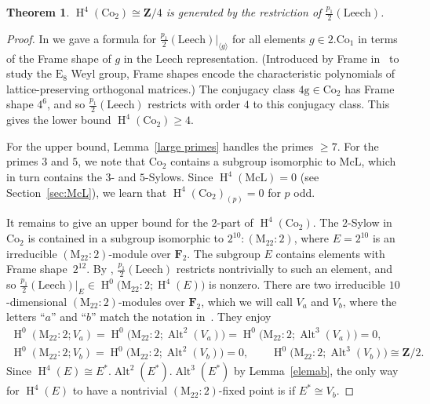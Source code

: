 \documentclass[pdftex]{sigma}
\numberwithin{equation}{section}
\newtheorem{Theorem}{Theorem}[section]
\newcommand\bF{\mathbf F}
\newcommand\bZ{\mathbf Z}
\newcommand\rg{\mathrm g}
\newcommand\rE{\mathrm E}
\newcommand\rM{\mathrm M}
\DeclareMathOperator\homology{H}
\renewcommand\H{\homology}
\newcommand\<\langle
\renewcommand\>\rangle
\newcommand\Co{\mathrm{Co}}
\newcommand\Leech{\mathrm{Leech}}
\DeclareMathOperator\Alt{Alt}
\begin{document}
\begin{Theorem}\label{thm.co2} $\H^4(\Co_2) \cong \bZ/4$ is generated by the restriction of $\frac{p_1}2(\Leech)$.
\end{Theorem}

\begin{proof} In \cite[Theorem 7.1]{jft} we gave a formula for $\frac{p_1}2(\Leech)|_{\langle g\rangle}$ for all elements $g \in 2.\Co_1$ in terms of the Frame shape of $g$ in the $\Leech$ representation. (Introduced by Frame in~\cite{MR0269751} to study the $\rE_8$ Weyl group, Frame shapes encode the characteristic polynomials of lattice-preserving orthogonal matrices.)
 The conjugacy class $4\rg \in \Co_2$ has Frame shape $4^6$, and so $\frac{p_1}2(\Leech)$ restricts with order $4$ to this conjugacy class. This gives the lower bound $\H^4(\Co_2) \geq 4$.

For the upper bound, Lemma~\ref{large primes} handles the primes $\geq 7$. For the primes $3$ and $5$, we note that $\Co_2$ contains a subgroup isomorphic to $\mathrm{McL}$, which in turn contains the $3$- and $5$-Sylows. Since $\H^4(\mathrm{McL}) = 0$ (see Section~\ref{sec:McL}), we learn that $\H^4(\Co_2)_{(p)} = 0$ for $p$ odd.

 It remains to give an upper bound for the $2$-part of $\H^4(\Co_2)$. The $2$-Sylow in $\Co_2$ is contained in a subgroup isomorphic to $2^{10}:(\mathrm{M}_{22}:2)$, where $E = 2^{10}$ is an irreducible $(\rM_{22}:2)$-module over $\bF_2$. The subgroup $E$ contains elements with Frame shape~$2^{12}$. By \cite[Theorem~7.1]{jft}, $\frac{p_1}2(\Leech)$ restricts nontrivially to such an element, and so $\frac{p_1}2(\Leech)|_E \in \H^0\big(\rM_{22}:2; \H^4(E)\big)$ is nonzero. There are two irreducible $10$-dimensional $(\rM_{22}:2)$-modules over $\bF_2$, which we will call $V_a$ and $V_b$, where the letters ``$a$'' and ``$b$'' match the notation in~\cite{ATLASonline}. They enjoy
 \begin{gather*}
 \H^0(\mathrm{M}_{22}:2; V_a) = \H^0\big(\mathrm{M}_{22}:2; \Alt^2(V_a)\big) = \H^0\big(\mathrm{M}_{22}:2; \Alt^3(V_a)\big) = 0, \\
 \H^0(\mathrm{M}_{22}:2; V_b) = \H^0\big(\mathrm{M}_{22}:2; \Alt^2(V_b)\big) = 0, \qquad \H^0\big(\mathrm{M}_{22}:2; \Alt^3(V_b)\big) \cong \bZ/2.
 \end{gather*}
 Since $\H^4(E) \cong E^*.\Alt^2(E^*).\Alt^3(E^*)$ by Lemma~\ref{elemab}, the only way for $\H^4(E)$ to have a nontrivial $(\mathrm{M}_{22}:2)$-fixed point is if $E^* \cong V_b$.


\end{proof}
\end{document}
